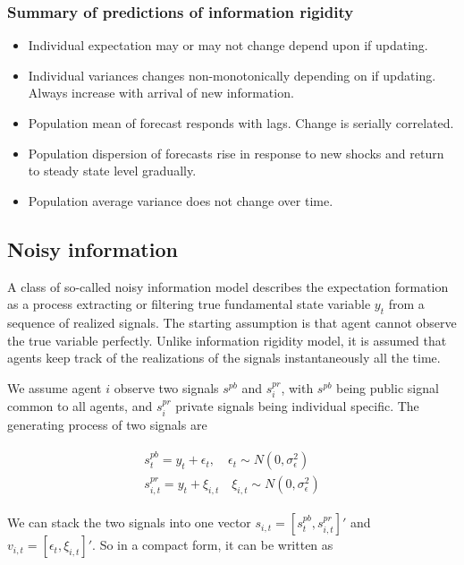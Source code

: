 \documentclass[]{article}
\begin{document}
\subsubsection{Summary of predictions of information rigidity}

\begin{itemize}
\item Individual expectation may or may not change depend upon if updating. 
\item Individual variances changes non-monotonically depending on if updating. Always increase with arrival of new information. 
\item Population mean of forecast responds with lags. Change is serially correlated. 
\item Population dispersion of forecasts rise in response to new shocks and return to steady state level gradually. 
\item Population average variance does not change over time. 
\end{itemize}

\subsection{Noisy information}

A class of so-called noisy information model describes the expectation formation as a process extracting or filtering true fundamental state variable $y_t$ from a sequence of realized signals. The starting assumption is that agent cannot observe the true variable perfectly. Unlike information rigidity model, it is assumed that agents keep track of the realizations of the signals instantaneously all the time. 

We assume agent $i$ observe two signals $s^{pb}$ and $s^{pr}_i$, with $s^{pb}$ being public signal common to all agents, and $s^{pr}_i$ private signals being individual specific. The generating process of two signals are 

\begin{eqnarray}
\begin{aligned}
s^{pb}_t = y_t + \epsilon_t, \quad \epsilon_t \sim N(0,\sigma^2_\epsilon)\\ 
s^{pr}_{i,t} = y_t + \xi_{i,t} \quad \xi_{i,t} \sim N(0,\sigma^2_\epsilon)
\end{aligned}
\end{eqnarray}

We can stack the two signals into one vector $s_{i,t} = [s^{pb}_t,s^{pr}_{i,t}]'$ and $v_{i,t}= [\epsilon_t,\xi_{i,t}]'$. So in a compact form, it can be written as
\end{document}
